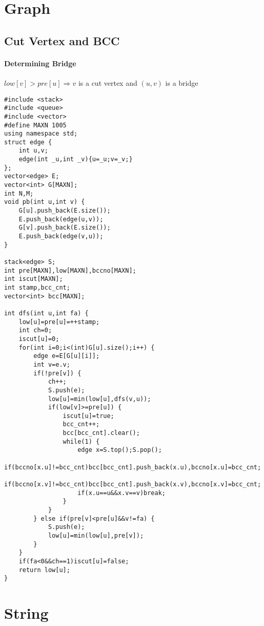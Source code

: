 \section{Graph}
\subsection{Cut Vertex and BCC}
\paragraph{Determining Bridge}
$low[v] > pre[u] \Rightarrow v$ is a cut vertex and $(u,v)$ is a bridge
\begin{lstlisting}
#include <stack>
#include <queue>
#include <vector>
#define MAXN 1005
using namespace std;
struct edge {
	int u,v;
	edge(int _u,int _v){u=_u;v=_v;}
};
vector<edge> E;
vector<int> G[MAXN];
int N,M;
void pb(int u,int v) {
	G[u].push_back(E.size());
	E.push_back(edge(u,v));
	G[v].push_back(E.size());
	E.push_back(edge(v,u));
}

stack<edge> S;
int pre[MAXN],low[MAXN],bccno[MAXN];
int iscut[MAXN];
int stamp,bcc_cnt;
vector<int> bcc[MAXN];

int dfs(int u,int fa) {
	low[u]=pre[u]=++stamp;
	int ch=0;
	iscut[u]=0;
	for(int i=0;i<(int)G[u].size();i++) {
		edge e=E[G[u][i]];
		int v=e.v;
		if(!pre[v]) {
			ch++;
			S.push(e);
			low[u]=min(low[u],dfs(v,u));
			if(low[v]>=pre[u]) {
				iscut[u]=true;
				bcc_cnt++;
				bcc[bcc_cnt].clear();
				while(1) {
					edge x=S.top();S.pop();
					if(bccno[x.u]!=bcc_cnt)bcc[bcc_cnt].push_back(x.u),bccno[x.u]=bcc_cnt;
					if(bccno[x.v]!=bcc_cnt)bcc[bcc_cnt].push_back(x.v),bccno[x.v]=bcc_cnt;
					if(x.u==u&&x.v==v)break;
				}
			}
		} else if(pre[v]<pre[u]&&v!=fa) {
			S.push(e);
			low[u]=min(low[u],pre[v]);
		}
	}
	if(fa<0&&ch==1)iscut[u]=false;
	return low[u];
}
\end{lstlisting}
\section{String}
